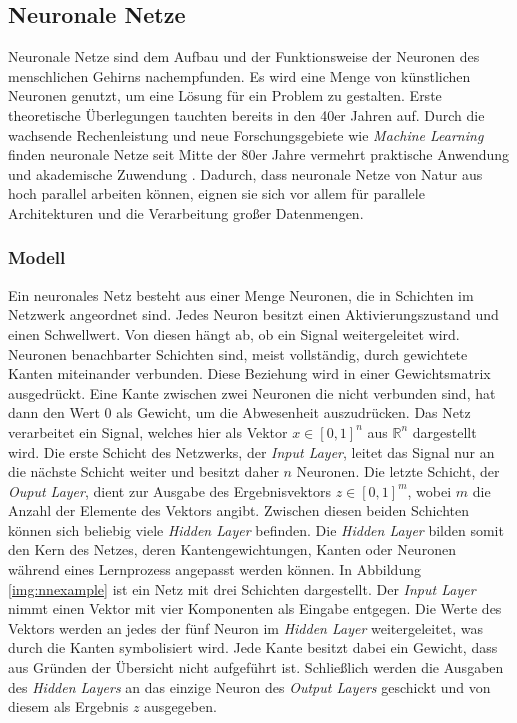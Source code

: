 \subsection{Neuronale Netze}

Neuronale Netze sind dem Aufbau und der Funktionsweise der Neuronen des menschlichen Gehirns nachempfunden. Es wird eine Menge von künstlichen Neuronen genutzt, um eine Lösung für ein Problem zu gestalten. Erste theoretische Überlegungen tauchten bereits in den 40er Jahren auf. Durch die wachsende Rechenleistung und neue Forschungsgebiete wie \textit{Machine Learning} finden neuronale Netze seit Mitte der 80er Jahre vermehrt praktische Anwendung und akademische Zuwendung \cite{nnk2007}. Dadurch, dass neuronale Netze von Natur aus hoch parallel arbeiten können, eignen sie sich vor allem für parallele Architekturen und die Verarbeitung großer Datenmengen. 

\subsubsection{Modell}
Ein neuronales Netz besteht aus einer Menge Neuronen, die in Schichten im Netzwerk angeordnet sind. Jedes Neuron besitzt einen Aktivierungszustand und einen Schwellwert. Von diesen hängt ab, ob ein Signal weitergeleitet wird. Neuronen benachbarter Schichten sind, meist vollständig, durch gewichtete Kanten miteinander verbunden. Diese Beziehung wird in einer Gewichtsmatrix ausgedrückt. Eine Kante zwischen zwei Neuronen die nicht verbunden sind, hat dann den Wert 0 als Gewicht, um die Abwesenheit auszudrücken. 
Das Netz verarbeitet ein Signal, welches hier als Vektor $x \in [0,1]^n$ aus $\mathbb{R}^n$ dargestellt wird. Die erste Schicht des Netzwerks, der \textit{Input Layer}, leitet das Signal nur an die nächste Schicht weiter und besitzt daher $n$ Neuronen. Die letzte Schicht, der \textit{Ouput Layer}, dient zur Ausgabe des Ergebnisvektors $z \in [0,1]^m$, wobei $m$ die Anzahl der Elemente des Vektors angibt. Zwischen diesen beiden Schichten können sich beliebig viele \textit{Hidden Layer} befinden. Die \textit{Hidden Layer} bilden somit den Kern des Netzes, deren Kantengewichtungen, Kanten oder Neuronen während eines Lernprozess angepasst werden können. \newline
In Abbildung \ref{img:nnexample} ist ein Netz mit drei Schichten dargestellt. Der \textit{Input Layer} nimmt einen Vektor mit vier Komponenten als Eingabe entgegen. Die Werte des Vektors werden an jedes der fünf Neuron im \textit{Hidden Layer} weitergeleitet, was durch die Kanten symbolisiert wird. Jede Kante besitzt dabei ein Gewicht, dass aus Gründen der Übersicht nicht aufgeführt ist. Schließlich werden die Ausgaben des \textit{Hidden Layers} an das einzige Neuron des \textit{Output Layers} geschickt und von diesem als Ergebnis $z$ ausgegeben.


